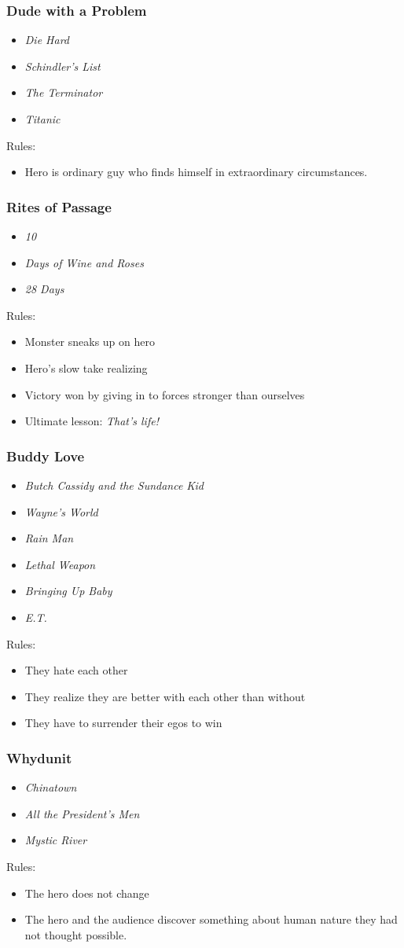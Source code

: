 \documentclass{beamer}
\newcommand{\bi}{\begin{itemize}}
\newcommand{\ei}{\end{itemize}}
\begin{document}
\begin{frame}\frametitle{Dude with a Problem}
\bi
\item {\sl Die Hard}
\item {\sl Schindler's List}
\item {\sl The Terminator}
\item {\sl Titanic}
\ei
Rules:
\bi
\item Hero is ordinary guy who finds himself in extraordinary
circumstances.
\ei

\end{frame}
\begin{frame}\frametitle{Rites of Passage}
\bi
\item {\sl 10}
\item {\sl Days of Wine and Roses}
\item {\sl 28 Days}
\ei
Rules:
\bi
\item Monster sneaks up on hero
\item Hero's slow take realizing
\item Victory won by giving in to forces stronger than ourselves
\item Ultimate lesson:  {\em That's life!}
\ei


\end{frame}
\begin{frame}\frametitle{Buddy Love}
\bi
\item {\sl Butch Cassidy and the Sundance Kid}
\item {\sl Wayne's World}
\item {\sl Rain Man}
\item {\sl Lethal Weapon}
\item {\sl Bringing Up Baby}
\item {\sl E.T.}
\ei
Rules:
\bi
\item They hate each other
\item They realize they are better with each other than without
\item They have to surrender their egos to win
\ei


\end{frame}
\begin{frame}\frametitle{Whydunit}
\bi
\item {\sl Chinatown}
\item {\sl All the President's Men}
\item {\sl Mystic River}
\ei
Rules:
\bi
\item The hero does not change
\item The hero and the audience discover something about human nature
they had not thought possible.
\ei


\end{frame}
\end{document}

